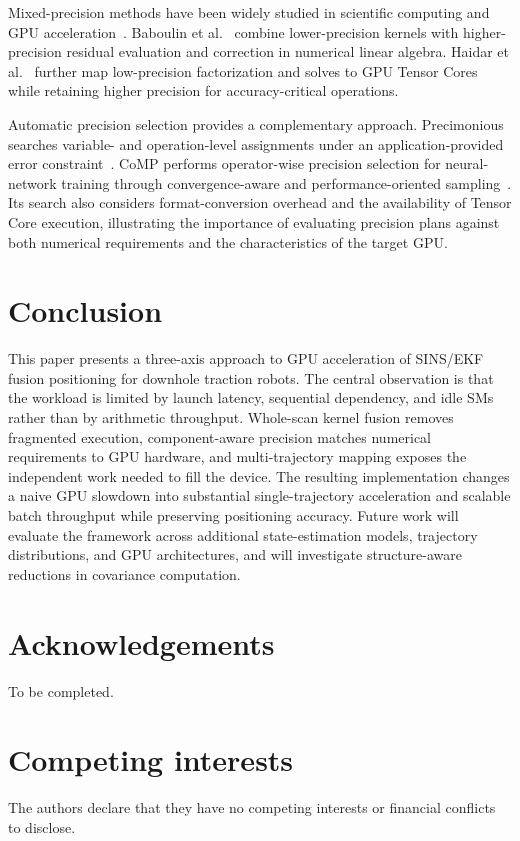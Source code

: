 \documentclass[research]{fcs}
\begin{document}
Mixed-precision methods have been widely studied in scientific computing and GPU acceleration~\cite{abdelfattah2021survey}. Baboulin et al.~\cite{mixed-precision} combine lower-precision kernels with higher-precision residual evaluation and correction in numerical linear algebra. Haidar et al.~\cite{haidar2018tensorcores} further map low-precision factorization and solves to GPU Tensor Cores while retaining higher precision for accuracy-critical operations.

Automatic precision selection provides a complementary approach. Precimonious searches variable- and operation-level assignments under an application-provided error constraint~\cite{rubio2013precimonious}. CoMP performs operator-wise precision selection for neural-network training through convergence-aware and performance-oriented sampling~\cite{dai2025comp}. Its search also considers format-conversion overhead and the availability of Tensor Core execution, illustrating the importance of evaluating precision plans against both numerical requirements and the characteristics of the target GPU.

\section{Conclusion}
\label{sec:conclusion}

This paper presents a three-axis approach to GPU acceleration of SINS/EKF fusion positioning for downhole traction robots. The central observation is that the workload is limited by launch latency, sequential dependency, and idle SMs rather than by arithmetic throughput. Whole-scan kernel fusion removes fragmented execution, component-aware precision matches numerical requirements to GPU hardware, and multi-trajectory mapping exposes the independent work needed to fill the device. The resulting implementation changes a naive GPU slowdown into substantial single-trajectory acceleration and scalable batch throughput while preserving positioning accuracy. Future work will evaluate the framework across additional state-estimation models, trajectory distributions, and GPU architectures, and will investigate structure-aware reductions in covariance computation.

\fontsize{8.5pt}{10pt}\selectfont

\section*{Acknowledgements}
To be completed.

\section*{Competing interests}
The authors declare that they have no competing interests or financial conflicts to disclose.




\end{document}
